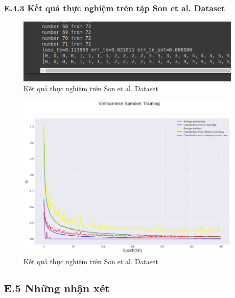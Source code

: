 \documentclass{article}
\begin{document}
	\subsubsection{E.4.3 Kết quả thực nghiệm trên tập Son et al. Dataset}
	\begin{figure}[H]
		\centering
		\includegraphics[width=.75\textwidth]{result/evaluate_result_vn_speaker.png}
		\caption{Kết quả thực nghiệm trên Son et al. Dataset}
		\label{fig:writing-thesis}
	\end{figure}
	\begin{figure}[H]
		\centering
		\includegraphics[width=.75\textwidth]{result/sincnet_vietnamese_plot.png}
		\caption{Kết quả thực nghiệm trên Son et al. Dataset}
		\label{fig:writing-thesis}
	\end{figure}
	\subsection{E.5 Những nhận xét}
	
	\nocite{*}
	\newpage\cleardoublepage
	
	
\end{document}
